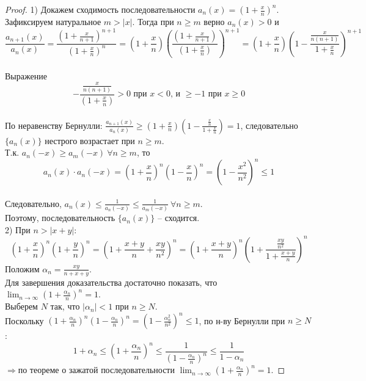     \begin{proof}
        1) Докажем сходимость последовательности $a_{n} (x) = (1 + \frac{x}{n})^n$. Зафиксируем натуральное $m > |x|$. Тогда при $n \geq m$ верно $a_{n} (x) > 0$ и
        \[\frac{a_{n+1}(x)}{a_{n}(x)} = \frac{\left(1 + \frac{x}{n+1}\right)^{n+1}}{\left(1 + \frac{x}{n}\right)^{n}} = \left(1 + \frac{x}{n}\right)\left(\frac{(1 + \frac{x}{n+1})}{(1 + \frac{x}{n})}\right)^{n+1} = \left(1 + \frac{x}{n}\right)\left(1 - \frac{\frac{x}{n(n+1)}}{1 + \frac{x}{n}}\right)^{n+1}\]
        \\
        Выражение
        \[- \frac{\frac{x}{n(n+1)}}{(1 + \frac{x}{n})} > 0 \text{ при $x < 0$, и $\geq -1$ при $x \geq 0$}\]
        \\
        По неравенству Бернулли: $\frac{a_{n+1}(x)}{a_{n}(x)} \geq \left(1 + \frac{x}{n}\right)\left(1 - \frac{\frac{x}{n}}{1 + \frac{x}{n}}\right) = 1$, следовательно $\{a_{n}(x)\}$ нестрого возрастает при $n \geq m$.
        \\
        Т.к. $a_{n} (-x) \geq a_{m}(-x) \ \forall n \geq m$, то
        \[a_{n}(x) \cdot a_{n}(-x) = \left(1 + \frac{x}{n}\right)^{n}\left(1 - \frac{x}{n}\right)^{n} = \left(1 - \frac{x^{2}}{n^{2}}\right)^{n} \leq 1\]
        \\
        Следовательно, $a_{n}(x) \leq \frac{1}{a_{n}(-x)} \leq \frac{1}{a_{m}(-x)} \ \forall n \geq m$.
        \\
        Поэтому, последовательность $\{a_{n}(x)\}$ -- сходится.
        \\
        2) При $n > |x + y|$: 
        \[\left(1 + \frac{x}{n}\right)^{n} \left(1 + \frac{y}{n}\right)^{n} = \left(1 + \frac{x + y}{n} + \frac{xy}{n^{2}}\right)^{n} = \left(1 + \frac{x+y}{n}\right)^{n}\left(1 + \frac{\frac{xy}{n^{2}}}{1 + \frac{x + y}{n}}\right)^{n}\]
        Положим $\alpha_{n} = \frac{xy}{n + x + y}$.
        \\
        Для завершения доказательства достаточно показать, что $\lim_{n \to \infty} \left(1 + \frac{\alpha_{n}}{n}\right)^{n} = 1$.
        \\
        Выберем $N$ так, что $|\alpha_{n}| < 1$ при $n \geq N$.
        \\
        Поскольку $\left(1 + \frac{\alpha_{n}}{n}\right)^{n}\left(1 - \frac{\alpha_{n}}{n}\right)^{n} = \left(1 - \frac{\alpha_{n}^{2}}{n^{2}}\right)^{n} \leq 1$, по н-ву Бернулли при $n \geq N$:
        \[1 + \alpha_{n} \leq \left(1 + \frac{\alpha_{n}}{n}\right)^{n} \leq \frac{1}{\left(1 - \frac{\alpha_{n}}{n}\right)^{n}} \leq \frac{1}{1 - \alpha_{n}}\]
        $\Rightarrow \text{по теореме о зажатой последовательности } \lim_{n \to \infty} \left(1 + \frac{\alpha_{n}}{n}\right)^{n} = 1$.
    \end{proof}

